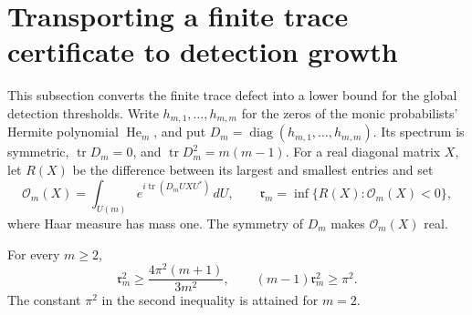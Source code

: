 \section{Transporting a finite trace certificate to detection growth}
\label{sec:trace-detection}

This subsection converts the finite trace defect into a lower bound for
the global detection thresholds.  Write $h_{m,1},\ldots,h_{m,m}$ for the
zeros of the monic probabilists' Hermite polynomial $\operatorname{He}_m$,
and put $D_m=\operatorname{diag}(h_{m,1},\ldots,h_{m,m})$.  Its spectrum
is symmetric, $\operatorname{tr}D_m=0$, and
$\operatorname{tr}D_m^2=m(m-1)$.  For a real diagonal matrix $X$, let
$R(X)$ be the difference between its largest and smallest entries and set
\[
 \mathcal O_m(X)=\int_{U(m)}e^{i\operatorname{tr}(D_mUXU^*)}\,dU,
 \qquad
 \mathfrak r_m=\inf\{R(X):\mathcal O_m(X)<0\},
\]
where Haar measure has mass one.  The symmetry of $D_m$ makes
$\mathcal O_m(X)$ real.

\begin{proposition}
\label{prop:orbital-unimodal-bound}
For every $m\ge2$,
\begin{equation}
 \mathfrak r_m^2\ge\frac{4\pi^2(m+1)}{3m^2},
 \qquad (m-1)\mathfrak r_m^2\ge\pi^2.
 \label{eq:orbital-unimodal-radius}
\end{equation}
The constant $\pi^2$ in the second inequality is attained for $m=2$.
\end{proposition}

